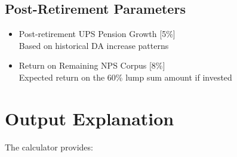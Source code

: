 \documentclass{article}
\begin{document}
\subsection{Post-Retirement Parameters}
\begin{itemize}
    \item Post-retirement UPS Pension Growth [5\%] \\
          Based on historical DA increase patterns
    \item Return on Remaining NPS Corpus [8\%] \\
          Expected return on the 60\% lump sum amount if invested
\end{itemize}

\section{Output Explanation}
The calculator provides:
\end{document}
